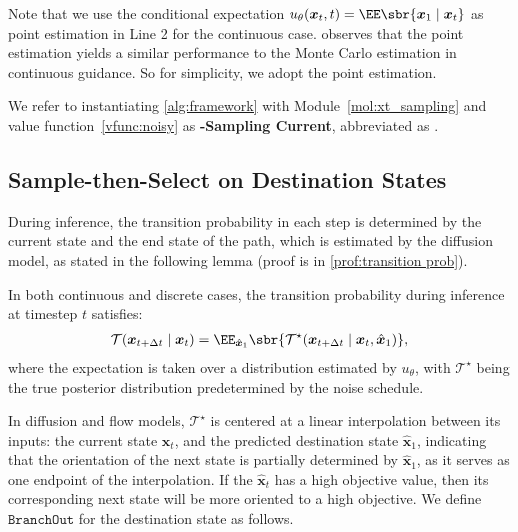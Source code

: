 Note that we use the conditional expectation $u_\theta(\boldsymbol{x}_t, t) = \EE \sbr{\boldsymbol{x}_1 \mid \boldsymbol{x}_t} $ as point estimation in Line 2 for the continuous case. \citet{ye2024tfg} observes that the point estimation yields a similar performance to the Monte Carlo estimation \citep{song2023loss} in continuous guidance. So for simplicity, we adopt the point estimation.

We refer to instantiating \cref{alg:framework} with Module~\ref{mol:xt_sampling} and value function~\ref{vfunc:noisy} as \textbf{\ouralg-Sampling Current}, abbreviated as \textbf{\xtsampling}.





\subsection{Sample-then-Select on Destination States}\label{subsec:x1sampling}
During inference, the transition probability in each step is determined by the current state and the end state of the path, which is estimated by the diffusion model, as stated in the following lemma (proof is in \cref{prof:transition prob}).
\begin{lemma} \label{lemma:transition prob}
In both continuous and discrete cases, the transition probability during inference at timestep $t$ satisfies:
\begin{equation}
\label{eqn:path_transition}
\begin{aligned}
    \mathcal{T}(\boldsymbol{x}_{t + \Delta t} \mid \boldsymbol{x}_{t}) = \EE_{{\hat{\boldsymbol{x}}}_1} \sbr{\mathcal{T}^{\star}(\boldsymbol{x}_{t + \Delta t} \mid \boldsymbol{x}_{t}, \hat{{\boldsymbol{x}}}_1)},
\end{aligned}
\end{equation}
where the expectation is taken over a distribution estimated by $u_\theta$, with $\mathcal{T}^{\star}$ being the true posterior distribution predetermined by the noise schedule.
\end{lemma}

In diffusion and flow models, $\mathcal{T}^{\star}$ is centered at a linear interpolation between its inputs: 
the current state $\boldsymbol{x}_{t}$, and the predicted destination state $\hat{{\boldsymbol{x}}}_1$, indicating that the orientation of the next state is partially determined by $\hat{\boldsymbol{x}}_1$, as it serves as one endpoint of the interpolation. If the $\hat{\boldsymbol{x}}_t$ has a high objective value, then its corresponding next state will be more oriented to a high objective. We define $\texttt{BranchOut}$ for the destination state as follows.










